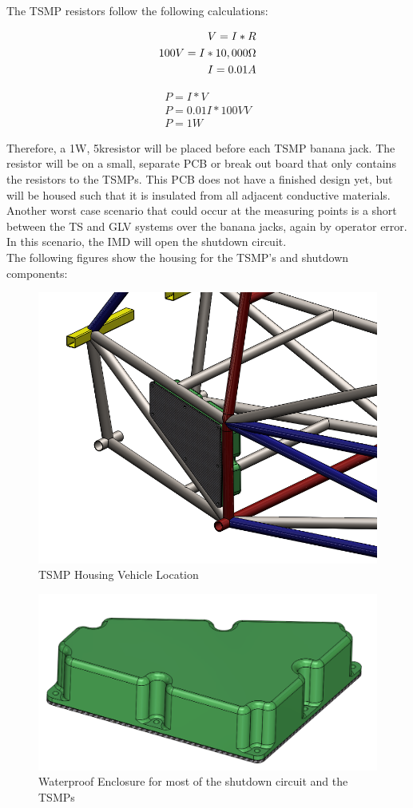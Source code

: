 \documentclass{article}
\begin{document}
    The TSMP resistors follow the following calculations:

                \begin{align}
                V = I * R \\
                100 V = I * 10,000 \ohm \\
                I = 0.01A
            \end{align}

            \begin{align}
                P = I * V \\
                P = 0.01 I * 100V V \\
                P = 1 W
            \end{align}

            Therefore, a 1W, 5k\ohm resistor will be placed before each TSMP banana jack. The resistor will be on a small, separate PCB or break out board that only contains the resistors to the TSMPs. This PCB does not have a finished design yet, but will be housed such that it is insulated from all adjacent conductive materials.\\

            Another worst case scenario that could occur at the measuring points is a short between the TS and GLV systems over the banana jacks, again by operator error. In this scenario, the IMD will open the shutdown circuit.
    \\
    The following figures show the housing for the TSMP's and shutdown components:

    \begin{figure}[H]
        \centering
        \includegraphics[width = 0.6 \textwidth]{CONTROLPANEL_1}
        \caption{TSMP Housing Vehicle Location}
        \label{tsmplocation}
    \end{figure}

    \begin{figure}[H]
        \centering
        \includegraphics[width = 0.6 \textwidth]{CONTROLPANEL_2}
        \caption{Waterproof Enclosure for most of the shutdown circuit and the TSMPs}
        \label{tsmpbox}
    \end{figure}
\end{document}
